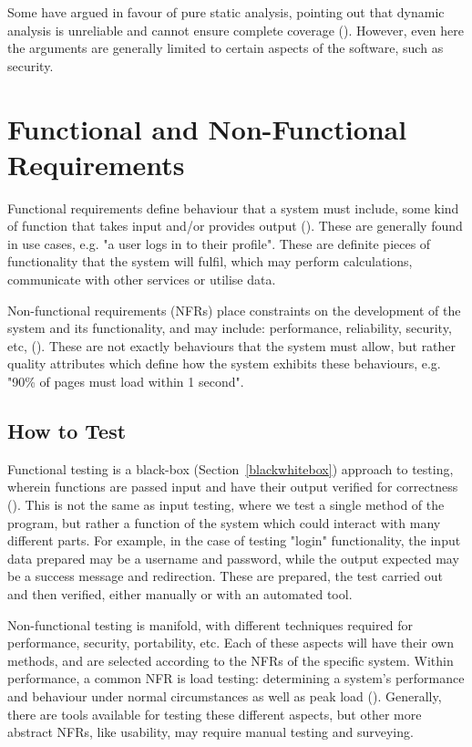 \documentclass[12pt]{article}
\begin{document}
Some have argued in favour of pure static analysis, pointing out that dynamic analysis is unreliable and cannot ensure complete coverage (). However, even here the arguments are generally limited to certain aspects of the software, such as security. 



\section{Functional and Non-Functional Requirements} \label{reqs}

Functional requirements define behaviour that a system must include, some kind of function that takes input and/or provides output (). These are generally found in use cases, e.g. "a user logs in to their profile". These are definite pieces of functionality that the system will fulfil, which may perform calculations, communicate with other services or utilise data.

Non-functional requirements (NFRs) place constraints on the development of the system and its functionality, and may include: performance, reliability, security, etc, (). These are not exactly behaviours that the system must allow, but rather quality attributes which define how the system exhibits these behaviours, e.g. "90\% of pages must load within 1 second".



\subsection{How to Test}

Functional testing is a black-box (Section~\ref{blackwhitebox}) approach to testing, wherein functions are passed input and have their output verified for correctness (). This is not the same as input testing, where we test a single method of the program, but rather a function of the system which could interact with many different parts. For example, in the case of testing "login" functionality, the input data prepared may be a username and password, while the output expected may be a success message and redirection. These are prepared, the test carried out and then verified, either manually or with an automated tool.

Non-functional testing is manifold, with different techniques required for performance, security, portability, etc. Each of these aspects will have their own methods, and are selected according to the NFRs of the specific system. Within performance, a common NFR is load testing: determining a system's performance and behaviour under normal circumstances as well as peak load (). Generally, there are tools available for testing these different aspects, but other more abstract NFRs, like usability, may require manual testing and surveying.
\end{document}
